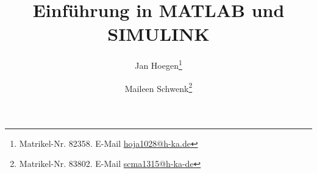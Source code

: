 

\hypersetup{
    colorlinks=true,
    bookmarksnumbered=true,
}


\flushbottom                                        %



        
\newcommand{\missing}{%
    \textcolor{coloryellow}{MISSING}%
    \PackageWarning{rtl_labor}{You used the 'missing' macro at this line. Remove it before finalising document}%
}
\newcommand{\improve}{%
    \textcolor{coloryellow}{IMPROVE}%
    \PackageWarning{rtl_labor}{You used the 'improve' macro at this line. Remove it before finalising document}%
}

\newcommand{\legend}[1]{\par\footnotesize\textbf{Legende}: #1\par}
\newcommand{\figsource}[1]{\par\footnotesize\textbf{Quelle:} #1\par}


\titlehead{%
    Hochschule Karlsruhe\\
    University of Applied Sciences\\
    Fakultät für Elektro- und Informationstechnik
}
\subject{Labor Regelungstechnik}
\title{Einführung in MATLAB und SIMULINK}


\author{%
    Jan Hoegen\thanks{%
        Matrikel-Nr. 82358. E-Mail \href{mailto:hoja1028@h-ka.de}{hoja1028@h-ka.de}}%
    \and%
    Maileen Schwenk\thanks{%
        Matrikel-Nr. 83802. E-Mail \href{mailto:scma1315@h-ka-de}{scma1315@h-ka-de}}
}

